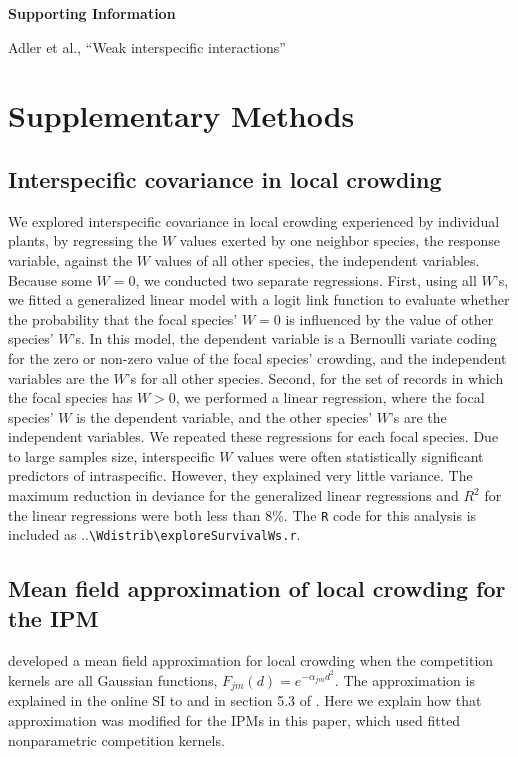 \documentclass[11pt]{article}
\begin{document}
\clearpage 
\newpage 

\setcounter{page}{1}
\setcounter{equation}{0}
\setcounter{figure}{0}
\setcounter{section}{0}
\setcounter{table}{0}
\renewcommand{\theequation}{SI.\arabic{equation}}
\renewcommand{\thetable}{SI-\arabic{table}}
\renewcommand{\thefigure}{SI-\arabic{figure}}
\renewcommand{\thesection}{Section SI.\arabic{section}}

\centerline{\Large \textbf{Supporting Information }}
\centerline{Adler et al., ``Weak interspecific interactions''} 

\vspace{0.4in} 

\section{Supplementary Methods} \label{suppMethods}

\subsection{Interspecific covariance in local crowding} 
We explored interspecific covariance in local crowding experienced by individual plants, by regressing the $W$ values exerted by one neighbor species, the response variable, against the $W$ values of all other species, the independent variables. Because some $W=0$, we conducted two separate regressions. First, using all $W$'s, we fitted a generalized linear model with a logit link function to evaluate whether the probability that the focal species' $W=0$ is influenced by the value of other species' $W$'s. In this model, the dependent variable is a Bernoulli variate coding for the zero or non-zero value of the focal species' crowding, and the independent variables are the $W$'s for all other species. Second, for the set of records in which the focal species has $W>0$, we performed a linear regression, where the focal species' $W$ is the dependent variable, and the other species' $W$'s are the independent variables. We repeated these regressions for each focal species. Due to large samples size, interspecific $W$ values were often statistically significant predictors of intraspecific. However, they explained very little variance. The maximum reduction in deviance for the generalized linear regressions and $R^2$ for the linear regressions were both less than 8\%. The \texttt{R} code for this analysis is included as ..\texttt{\textbackslash Wdistrib\textbackslash exploreSurvivalWs.r}.

\subsection{Mean field approximation of local crowding for the IPM} 
\citet{adler_coexistence_2010} developed a mean field approximation for local crowding when the
competition kernels are all Gaussian functions, $F_{jm}(d) = e^{-\alpha_{jm} d^2}$. The approximation is explained in 
the online SI to \citet{adler_coexistence_2010} and in section 5.3 of \citet{Ellner2016}. 
Here we explain how that approximation was modified for the IPMs in this paper, which
used fitted nonparametric competition kernels. 
\end{document}
